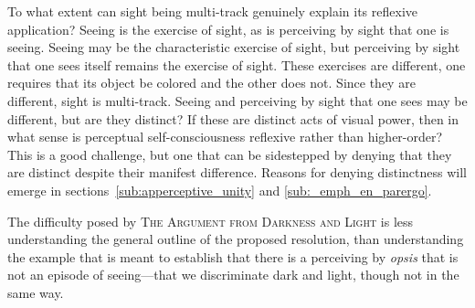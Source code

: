 To what extent can sight being multi-track genuinely explain its reflexive application? Seeing is the exercise of sight, as is perceiving by sight that one is seeing. Seeing may be the characteristic exercise of sight, but perceiving by sight that one sees itself remains the exercise of sight. These exercises are different, one requires that its object be colored and the other does not. Since they are different, sight is multi-track. Seeing and perceiving by sight that one sees may be different, but are they distinct? If these are distinct acts of visual power, then in what sense is perceptual self-consciousness reflexive rather than higher-order? This is a good challenge, but one that can be sidestepped by denying that they are distinct despite their manifest difference. Reasons for denying distinctness will emerge in sections~\ref{sub:apperceptive_unity} and \ref{sub:_emph_en_parergo}.

The difficulty posed by \textsc{The Argument from Darkness and Light} is less understanding the general outline of the proposed resolution, than understanding the example that is meant to establish that there is a perceiving by \emph{opsis} that is not an episode of seeing—that we discriminate dark and light, though not in the same way.

